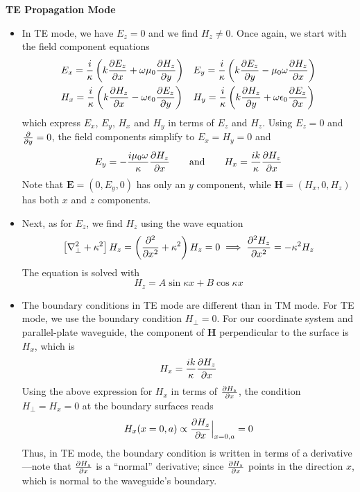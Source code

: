 \documentclass[11pt, a4paper]{article}
\newcommand{\eqtext}[1]{\qquad \text{#1} \qquad}
\renewcommand{\vec}[1]{\bm{#1}} %
\newcommand{\E}{\vec{E}}  %
\renewcommand{\H}{\vec{H}}  %
\newcommand{\ee}{\epsilon_{0}}  %
\newcommand{\mm}{\mu_{0}}  %
\newcommand{\m}{\vec{m}}  %
\renewcommand{\laplacian}{\nabla^{2}}
\begin{document}
\textbf{TE Propagation Mode}
\begin{itemize}
	\item In TE mode, we have $ E_{z} = 0 $ and we find $ H_{z} \neq 0 $. Once again, we start with the field component equations
	\begin{align*}
		&E_{x} = \frac{i}{\kappa} \left(k \pdv{E_{z}}{x} + \omega \mm \pdv{H_{z}}{y}\right) && E_{y} = \frac{i}{\kappa}\left( k \pdv{E_{z}}{y} - \mm \omega \pdv{H_{z}}{x}\right)\\
		&H_{x} = \frac{i}{\kappa} \left(k\pdv{H_{z}}{x} - \omega \ee \pdv{E_{z}}{y}\right) && H_{y} = \frac{i}{\kappa}\left( k\pdv{H_{z}}{y} + \omega \ee \pdv{E_{z}}{x}\right)
	\end{align*}
	which express $ E_{x}$, $ E_{y} $, $ H_{x} $ and $ H_{y} $ in terms of $ E_{z} $ and $ H_{z} $. Using $ E_{z} = 0 $ and $ \pdv{y} = 0 $, the field components simplify to $ E_{x} = H_{y} = 0 $ and
	\begin{align*}
		E_{y} = -\frac{i\mm \omega}{\kappa} \pdv{H_{z}}{x} \eqtext{and} H_{x} = \frac{ik}{\kappa}\pdv{H_{z}}{x}
	\end{align*}
	Note that $ \E = (0, E_{y}, 0) $ has only an $ y $ component, while $ \H = (H_{x}, 0, H_{z}) $ has both $ x $ and $ z $ components.
	
	\item Next, as for $ E_{z} $, we find $ H_{z} $ using the wave equation
	\begin{equation*}
		\left[\laplacian_{\perp} + \kappa^{2}\right]H_{z} = \left(\pdv[2]{}{x} + \kappa^{2}\right)H_{z} = 0 \implies \pdv[2]{H_{z}}{x} = - \kappa^{2}H_{z}
	\end{equation*}
	The equation is solved with
	\begin{equation*}
		H_{z} = A \sin \kappa x + B \cos \kappa x
	\end{equation*}
	
	\item The boundary conditions in TE mode are different than in TM mode. For TE mode, we use the boundary condition $ H_{\perp} = 0 $. For our coordinate system and parallel-plate waveguide, the component of $ \H $ perpendicular to the surface is $ H_{x} $, which is
	\begin{equation*}
		H_{x} = \frac{ik}{\kappa}\pdv{H_{z}}{x}
	\end{equation*}
	Using the above expression for $ H_{x} $ in terms of $ \pdv{H_{z}}{x} $, the condition $ H_{\perp} = H_{x} = 0 $ at the boundary surfaces reads
	\begin{equation*}
		H_{x}(x = 0, a) \propto \pdv{H_{z}}{x}\Big|_{x = 0, a} = 0
	\end{equation*}
	Thus, in TE mode, the boundary condition is written in terms of a derivative---note that $ \pdv{H_{z}}{x} $ is a ``normal'' derivative; since $ \pdv{H_{z}}{x}  $ points in the direction $ x $, which is normal to the waveguide's boundary. 
	

\end{itemize}
\end{document}
